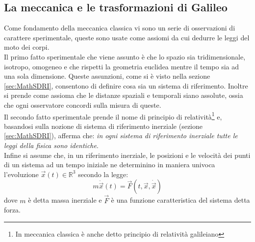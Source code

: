 \subsection{La meccanica e le trasformazioni di Galileo}
Come fondamento della meccanica classica vi sono un serie di osservazioni di carattere sperimentale, queste sono usate come assiomi da cui dedurre le leggi del moto dei corpi.\\

Il primo fatto sperimentale che viene assunto è che lo spazio sia tridimensionale, isotropo, omogeneo e che rispetti la geometria euclidea mentre il tempo sia ad una sola dimensione. Queste assunzioni, come si è visto nella sezione \ref{sec:MathSDRI}, consentono di definire cosa sia un sistema di riferimento. Inoltre si prende come assioma che le distanze spaziali e temporali siano assolute, ossia che ogni osservatore concordi sulla misura di queste.\\

Il secondo fatto sperimentale prende il nome di principio di relatività\footnote{In meccanica classica è anche detto principio di relatività galileiano} e, basandosi sulla nozione di sistema di riferimento inerziale (sezione \ref{sec:MathSDRI}), afferma che: \emph{in ogni sistema di riferimento inerziale tutte le leggi della fisica sono identiche}.\\

Infine si assume che, in un riferimento inerziale, le posizioni e le velocità dei punti di un sistema ad un tempo iniziale ne determinino in maniera univoca l'evoluzione $\vec x(t)\in \mathbb{R}^3$ secondo la legge:
\begin{equation}
	m\ddot{\vec{x}}(t)=\vec{F}(t,\vec{x},\dot{\vec{x}})
	\label{equazioneDiNewton}
\end{equation}
dove $m$ è detta massa inerziale e $\vec{F}$ è una funzione caratteristica del sistema detta forza.\\

